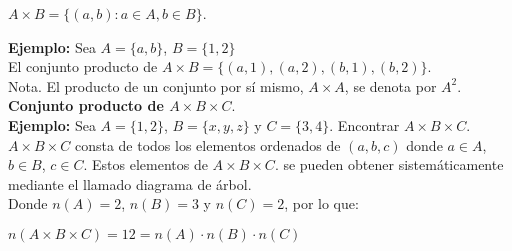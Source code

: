         \begin{center}
            $A \times B = \lbrace (a,b) : a \in A, b \in B\rbrace$.
        \end{center}

   \textbf{Ejemplo:}  Sea $A = \lbrace a, b \rbrace$, $B = \lbrace 1, 2 \rbrace$ \\

    El conjunto producto de $A \times B = \lbrace(a, 1), (a, 2), (b, 1), (b, 2)\rbrace$. \\
        

    Nota. El producto de un conjunto por sí mismo, $A \times A$, se denota por $A^2$. \vspace{5px}\\
\noindent \textbf{Conjunto producto de $A \times B  \times C.$} \\
         
   \noindent\textbf{Ejemplo:} Sea $A = \lbrace 1, 2 \rbrace$,
    $B = \lbrace x, y, z \rbrace$ y 
    $C = \lbrace 3, 4 \rbrace$.  Encontrar $A \times B  \times C.$ \\

    \noindent$A \times B  \times C$ consta de todos los elementos ordenados de $(a,b,c)$ donde $a \in A$, $b \in B$, $c \in C$. Estos elementos de $A \times B  \times C.$ se pueden obtener sistem\'aticamente mediante el llamado diagrama de \'arbol. \\

    Donde $n(A) = 2$, $n(B) = 3$ y $n(C) = 2$,  por lo que:

    \begin{center}
       $n(A \times B  \times C) = 12 = n(A) \cdot n(B) \cdot n(C)$
    \end{center}

     \vspace{10px}
     
